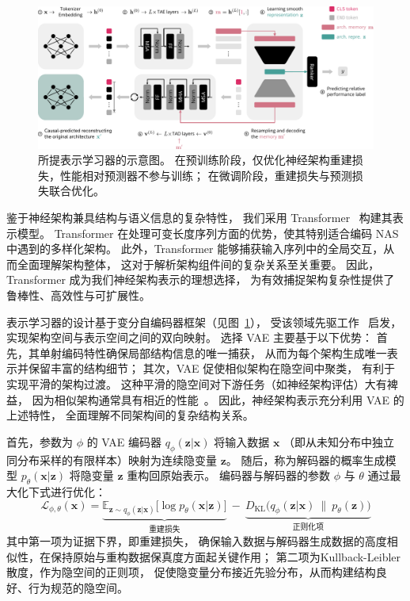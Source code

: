 \documentclass[../main.tex]{subfiles}
\begin{document}
\begin{figure}[t]
	\centering
	\includegraphics[width=\linewidth]{BRIDGE/repr-learner.pdf}
	\caption{
		所提表示学习器的示意图。
		在预训练阶段，仅优化神经架构重建损失，性能相对预测器不参与训练；
		在微调阶段，重建损失与预测损失联合优化。
	}\label{fig:repr-learner}
\end{figure}


鉴于神经架构兼具结构与语义信息的复杂特性，
我们采用 Transformer~\cite{DBLP:conf/nips/VaswaniSPUJGKP17,DBLP:conf/cvpr/YiZH0023} 构建其表示模型。
Transformer 在处理可变长度序列方面的优势，使其特别适合编码 NAS 中遇到的多样化架构。
此外，Transformer 能够捕获输入序列中的全局交互，从而全面理解架构整体，
这对于解析架构组件间的复杂关系至关重要。
因此，Transformer 成为我们神经架构表示的理想选择，
为有效捕捉架构复杂性提供了鲁棒性、高效性与可扩展性。

表示学习器的设计基于变分自编码器框架（见图~\ref{fig:repr-learner}），
受该领域先驱工作~\cite{DBLP:conf/nips/YanZAZ020,DBLP:conf/ijcnn/LukasikFZHK21} 启发，
实现架构空间与表示空间之间的双向映射。
选择 VAE 主要基于以下优势：
首先，其单射编码特性确保局部结构信息的唯一捕获，
从而为每个架构生成唯一表示并保留丰富的结构细节；
其次，VAE 促使相似架构在隐空间中聚类，
有利于实现平滑的架构过渡。
这种平滑的隐空间对下游任务（如神经架构评估）大有裨益，
因为相似架构通常具有相近的性能~\cite{Liu2020ASO}。
因此，神经架构表示充分利用 VAE 的上述特性，
全面理解不同架构间的复杂结构关系。

首先，参数为 $ \phi $ 的 VAE 编码器 $ q_{\phi}(\bm{z}|\bm{x}) $ 将输入数据 $ \bm{x} $
（即从未知分布中独立同分布采样的有限样本）映射为连续隐变量 $ \bm{z} $。
随后，称为解码器的概率生成模型 $ p_{\theta}(\bm{x}|\bm{z}) $ 将隐变量 $ \bm{z} $ 重构回原始表示。
编码器与解码器的参数 $ \phi $ 与 $ \theta $ 通过最大化下式进行优化：
\begin{equation}\label{eq:vae-loss}
	\mathcal{L}_{\phi,\theta}{(\bm{x})} = \underbrace{\mathbb{E}_{\bm{z} \sim q_{\phi}(\bm{z}|\bm{x})}{\big[\log{p_\theta(\bm{x}|\bm{z})}\big]}}_{\text{重建损失}} \:{-}\: \underbrace{D_\mathrm{KL}\big(q_\phi(\bm{z}|\bm{x})\:\|\:p_\theta(\bm{z})\big)}_{\text{正则化项}}
\end{equation}
其中第一项为证据下界，即重建损失，
确保输入数据与解码器生成数据的高度相似性，在保持原始与重构数据保真度方面起关键作用；
第二项为Kullback-Leibler 散度，作为隐空间的正则项，
促使隐变量分布接近先验分布，从而构建结构良好、行为规范的隐空间。
\end{document}
